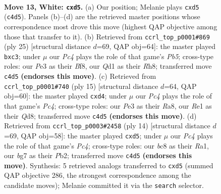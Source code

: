 \documentclass[11pt]{article}
\begin{document}
\begin{figure}[p]
\label{fig:thought-m22}
\end{figure}

\clearpage

\begin{figure}[p]\centering
\begin{subfigure}{0.46\textwidth}\centering
\resizebox{\linewidth}{!}{%
\newchessgame
\chessboard[
  setfen={r1bq1rk1/pp4bp/2n3p1/2pppp1n/2P4P/4PNP1/PP1P1P2/RNBQRK1B w - - 0 13},
  showmover=false,
  pgfstyle=straightmove, color=movearrow, markmove={c4-d5}
]}
\caption{}
\end{subfigure}\hfill
\begin{subfigure}{0.46\textwidth}\centering
\resizebox{\linewidth}{!}{%
\newchessgame
\chessboard[
  setfen={r3kb1r/1bq2p1p/p1np1np1/4p3/Pp2P3/2P3NP/NP2BPP1/R1BQ1RK1 b kq - 0 13},
  showmover=false,
  pgfstyle=straightmove, color=movearrow, markmove={b4-c3}
]}
\caption{}
\end{subfigure}
\\[4pt]
\begin{subfigure}{0.46\textwidth}\centering
\resizebox{\linewidth}{!}{%
\newchessgame
\chessboard[
  setfen={r2qkb1r/pb3ppp/1pnppn2/2p5/2PPP3/2N2N1P/PP2BPP1/R1BQ1RK1 b kq - 0 8},
  showmover=false,
  pgfstyle=straightmove, color=movearrow, markmove={c5-d4}
]}
\caption{}
\end{subfigure}\hfill
\begin{subfigure}{0.46\textwidth}\centering
\resizebox{\linewidth}{!}{%
\newchessgame
\chessboard[
  setfen={r2qkb1r/pbpn1ppp/1p2p3/3p4/2PPn3/P4NP1/1P2PPBP/RNBQ1RK1 w kq - 2 8},
  showmover=false,
  pgfstyle=straightmove, color=movearrow, markmove={c4-d5}
]}
\caption{}
\end{subfigure}
\caption{\textbf{Move 13, White: \texttt{cxd5}.} (a) Our position; Melanie plays \texttt{cxd5} (\texttt{c4d5}). Panels (b)--(d) are the retrieved master positions whose correspondence most drove this move (highest QAP objective among those that transfer to it). (b) Retrieved from \texttt{ccrl\_top\_p0001\#869} (ply 25) [structural distance $d$=69, QAP obj=64]: the master played \texttt{bxc3}; under $\mu$ our \emph{Pc4} plays the role of that game's \emph{Pb5}; cross-type roles: our \emph{P}e3 as their \emph{B}f8, our \emph{Q}d1 as their \emph{R}h8; transferred move \texttt{c4d5} \textbf{(endorses this move)}. (c) Retrieved from \texttt{ccrl\_top\_p0001\#740} (ply 15) [structural distance $d$=64, QAP obj=60]: the master played \texttt{cxd4}; under $\mu$ our \emph{Pc4} plays the role of that game's \emph{Pc4}; cross-type roles: our \emph{P}e3 as their \emph{R}a8, our \emph{R}e1 as their \emph{Q}d8; transferred move \texttt{c4d5} \textbf{(endorses this move)}. (d) Retrieved from \texttt{ccrl\_top\_p0003\#2458} (ply 14) [structural distance $d$=69, QAP obj=58]: the master played \texttt{cxd5}; under $\mu$ our \emph{Pc4} plays the role of that game's \emph{Pc4}; cross-type roles: our \emph{b}c8 as their \emph{R}a1, our \emph{b}g7 as their \emph{P}b2; transferred move \texttt{c4d5} \textbf{(endorses this move)}. Synthesis: 5 retrieved analogs transferred to \texttt{cxd5} (summed QAP objective 286, the strongest correspondence among the candidate moves); Melanie committed it via the \texttt{search} selector.}

\end{figure}
\end{document}
